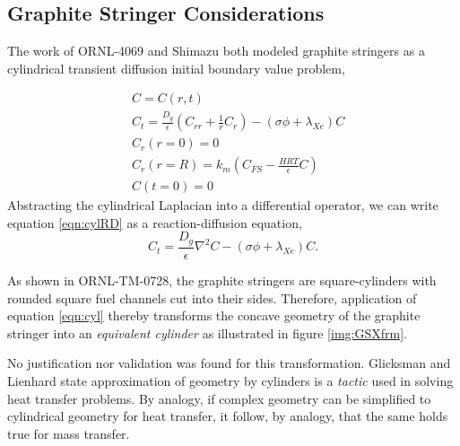\subsection{Graphite Stringer Considerations}

The work of ORNL-4069 and Shimazu both modeled graphite stringers as a cylindrical transient diffusion initial boundary value problem,


\begin{subequations}
\label{eqn:cyl}
\begin{align}
    &C = C(r,t) \\ 
    &C_t = \frac{D_g}{\epsilon} \left (C_{rr} + \frac{1}{r}C_r \right ) - (\sigma \phi + \lambda_{Xe})C \label{eqn:cylRD}\\        
        &C_r(r=0) = 0 \\
        &C_r(r=R) = k_m \left (C_{FS} - \frac{HRT}{\epsilon}C \right ) \\
        &C(t=0) = 0
\end{align}
\end{subequations}
Abstracting the cylindrical Laplacian into a differential operator, we can write equation \ref{eqn:cylRD} as a reaction-diffusion equation,
\begin{equation}
    C_t = \frac{D_g}{\epsilon} \nabla^2C - (\sigma \phi + \lambda_{Xe})C.
\end{equation}

As shown in ORNL-TM-0728, the graphite stringers are square-cylinders with rounded square fuel channels cut into their sides.  \cite[p. 80]{Robertson65}  Therefore, application of equation \ref{eqn:cyl} thereby transforms the concave geometry of the graphite stringer into an \textit{equivalent cylinder} as illustrated in figure \ref{img:GSXfrm}.


No justification nor validation was found for this transformation.  Glicksman and Lienhard state approximation of geometry by cylinders is a \textit{tactic} used in solving heat transfer problems. \cite[p. 73]{Glicksman2016}  By analogy, if complex geometry can be simplified to cylindrical geometry for heat transfer, it follow, by analogy, that the same holds true for mass transfer.

